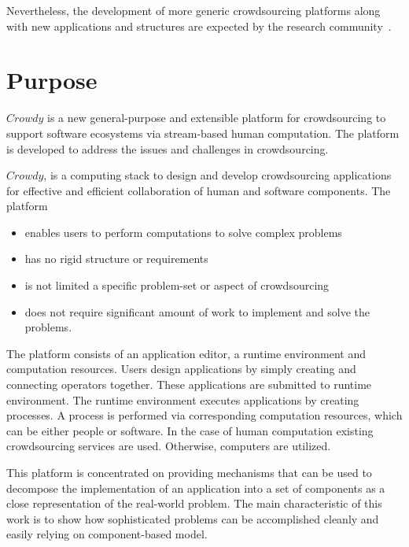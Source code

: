 
 
Nevertheless, the development of more generic crowdsourcing platforms 
along with new applications and structures are expected 
by the research community~\cite{Doan2011}.


\section{Purpose}

$Crowdy$ is a new general-purpose and extensible platform for crowdsourcing to 
support software ecosystems via stream-based human computation. The platform 
is developed to address the issues and challenges in crowdsourcing.

$Crowdy$, is a computing stack to design 
and develop crowdsourcing applications for effective and efficient collaboration of
human and software components. The platform
\begin{itemize}
	\item enables users to perform computations to solve complex problems
	\item has no rigid structure or requirements
	\item is not limited a specific problem-set or aspect of crowdsourcing
	\item does not require significant amount of work to implement and solve the problems.
\end{itemize}

The platform consists of an application editor, a runtime 
environment and computation resources. Users design applications by simply 
creating and connecting operators together. These applications are submitted to runtime 
environment. The runtime environment executes applications by creating processes. 
A process is performed via corresponding computation resources, which can be either 
people or software. In the case of human computation existing crowdsourcing services 
are used. Otherwise, computers are utilized.

This platform is concentrated on providing mechanisms that can be used to decompose 
the implementation of an application into a set of components as a close representation 
of the real-world problem. The main characteristic of this work is to show how 
sophisticated problems can be accomplished cleanly and easily relying on 
component-based model.


